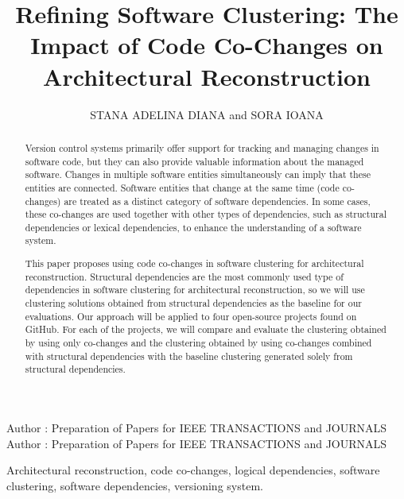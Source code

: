 \documentclass{ieeeaccess}
\begin{document}

\title{Refining Software Clustering: The Impact of Code Co-Changes on Architectural Reconstruction}
\author{\uppercase{Stana Adelina Diana} and
\uppercase{Sora Ioana}
}

\address[1]{Computer Science and Engineering Department
”Politehnica” University of Timisoara, Romania (e-mail: stana.adelina.diana@gmail.com)}
\address[2]{Computer Science and Engineering Department
”Politehnica” University of Timisoara, Romania (e-mail: ioana.sora@cs.upt.ro)}

\markboth
{Author \headeretal: Preparation of Papers for IEEE TRANSACTIONS and JOURNALS}
{Author \headeretal: Preparation of Papers for IEEE TRANSACTIONS and JOURNALS}



\begin{abstract}
Version control systems primarily offer support for tracking and managing changes in software code, but they can also provide valuable information about the managed software. Changes in multiple software entities simultaneously can imply that these entities are connected. Software entities that change at the same time (code co-changes) are treated as a distinct category of software dependencies. In some cases, these co-changes are used together with other types of dependencies, such as structural dependencies or lexical dependencies, to enhance the understanding of a software system.


This paper proposes using code co-changes in software clustering for architectural reconstruction. Structural dependencies are the most commonly used type of dependencies in software clustering for architectural reconstruction, so we will use clustering solutions obtained from structural dependencies as the baseline for our evaluations. Our approach will be applied to four open-source projects found on GitHub. For each of the projects, we will compare and evaluate the clustering obtained by using only co-changes and the clustering obtained by using co-changes combined with structural dependencies with the baseline clustering generated solely from structural dependencies.
\end{abstract}

\begin{keywords}
Architectural reconstruction, code co-changes, logical dependencies, software clustering, software dependencies, versioning system.
\end{keywords}
\end{document}
